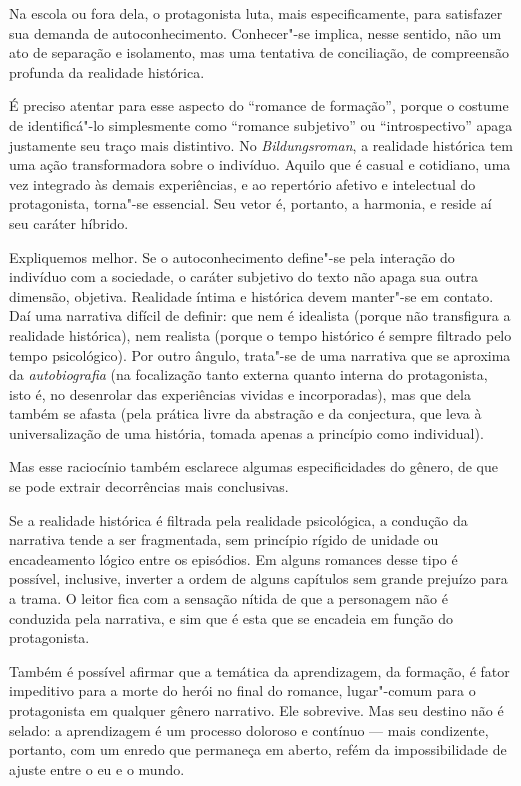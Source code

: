 Na escola ou fora dela, o protagonista luta, mais especificamente, para
satisfazer sua demanda de autoconhecimento. 
Conhecer"-se implica, nesse sentido, não um
ato de separação e isolamento, mas uma tentativa de conciliação, de
compreensão profunda da realidade histórica. 

É preciso atentar para esse aspecto do ``romance de
formação'', porque o costume de identificá"-lo simplesmente como
``romance subjetivo'' ou ``introspectivo'' apaga justamente seu traço mais
distintivo. No \textit{Bildungsroman}, a
realidade histórica tem uma ação transformadora sobre o indivíduo.
Aquilo que é casual e cotidiano, uma vez integrado às demais
experiências, e ao repertório afetivo e intelectual do protagonista,
torna"-se essencial. Seu vetor é, portanto, a harmonia, e reside aí
seu caráter híbrido. 

Expliquemos melhor. Se o autoconhecimento define"-se
pela interação do indivíduo com a sociedade, o caráter subjetivo do
texto não apaga sua outra dimensão, objetiva. Realidade íntima e
histórica devem manter"-se em contato. Daí uma narrativa difícil de
definir: que nem é idealista (porque não transfigura a realidade
histórica), nem realista (porque o tempo histórico é sempre filtrado
pelo tempo psicológico). Por outro ângulo, trata"-se de uma narrativa
que se aproxima da \textit{autobiografia} (na focalização tanto externa 
quanto interna do protagonista, isto é,
no desenrolar das experiências vividas e incorporadas), mas que dela
também se afasta (pela prática livre da abstração e da conjectura, que
leva à universalização de uma história, tomada apenas a princípio como
individual).

Mas esse raciocínio também esclarece algumas especificidades do gênero,
de que se pode extrair decorrências mais conclusivas.

Se a realidade histórica é filtrada pela realidade psicológica, a
condução da narrativa tende a ser fragmentada, sem princípio rígido de
unidade ou encadeamento lógico entre os episódios. Em alguns romances
desse tipo é possível, inclusive, inverter a ordem de alguns capítulos
sem grande prejuízo para a trama. O leitor fica com a sensação nítida
de que a personagem não é conduzida pela narrativa, e sim que é esta
que se encadeia em função do protagonista.

Também é possível afirmar que a temática da aprendizagem, da formação, é
fator impeditivo para a morte do herói no final do romance,
lugar"-comum para o protagonista em qualquer gênero narrativo. Ele
sobrevive. Mas seu destino não é selado: a aprendizagem é um processo
doloroso e contínuo --- mais condizente, portanto, com um enredo que
permaneça em aberto, refém da impossibilidade de ajuste entre o eu e o
mundo.
\asterisc

